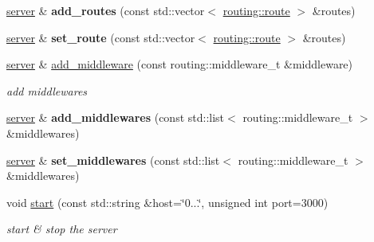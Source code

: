 \begin{DoxyCompactItemize}
\mbox{\label{classnetflex_1_1http_1_1server_a1363b27c4d5752706239407dc961d8d5}} 
\hyperlink{classnetflex_1_1http_1_1server}{server} \& {\bfseries add\+\_\+routes} (const std\+::vector$<$ \hyperlink{classnetflex_1_1routing_1_1route}{routing\+::route} $>$ \&routes)
\item 
\mbox{\label{classnetflex_1_1http_1_1server_ac55de13a22c11bbf5a93c5e105e2bf0b}} 
\hyperlink{classnetflex_1_1http_1_1server}{server} \& {\bfseries set\+\_\+route} (const std\+::vector$<$ \hyperlink{classnetflex_1_1routing_1_1route}{routing\+::route} $>$ \&routes)
\item 
\mbox{\label{classnetflex_1_1http_1_1server_a636cba8b31debed0d880db5905736450}} 
\hyperlink{classnetflex_1_1http_1_1server}{server} \& \hyperlink{classnetflex_1_1http_1_1server_a636cba8b31debed0d880db5905736450}{add\+\_\+middleware} (const routing\+::middleware\+\_\+t \&middleware)
\begin{DoxyCompactList}\small\item\em add middlewares \end{DoxyCompactList}\item 
\mbox{\label{classnetflex_1_1http_1_1server_a266ef122b1fd38062a5b45ef58f15b2a}} 
\hyperlink{classnetflex_1_1http_1_1server}{server} \& {\bfseries add\+\_\+middlewares} (const std\+::list$<$ routing\+::middleware\+\_\+t $>$ \&middlewares)
\item 
\mbox{\label{classnetflex_1_1http_1_1server_a1f7b8f1cfb800f68d9ca4cfa1ed3aa08}} 
\hyperlink{classnetflex_1_1http_1_1server}{server} \& {\bfseries set\+\_\+middlewares} (const std\+::list$<$ routing\+::middleware\+\_\+t $>$ \&middlewares)
\item 
\mbox{\label{classnetflex_1_1http_1_1server_a2eb01cb96d5ebe6c9ddc25eea32b14d0}} 
void \hyperlink{classnetflex_1_1http_1_1server_a2eb01cb96d5ebe6c9ddc25eea32b14d0}{start} (const std\+::string \&host=\char`\"{}0...\char`\"{}, unsigned int port=3000)
\begin{DoxyCompactList}\small\item\em start \& stop the server \end{DoxyCompactList}\item 

\end{DoxyCompactItemize}
